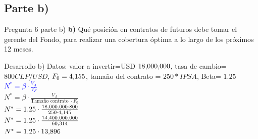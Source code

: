 \documentclass{beamer}
\newif\ifpresentacion
\newcommand{\pausa}{\ifpresentacion\pause\fi}
\begin{document}
  \subsection{Parte b)}
  \begin{frame}{Pregunta 6 parte b)}
    \textbf{b)} Qué posición en contratos de futuros debe tomar el gerente del Fondo, para realizar una cobertura óptima a lo largo de los próximos 12 meses.
  \end{frame}
  \begin{frame}{Desarrollo b)}
    Datos: valor a invertir=USD \(\miles{18000000}\),
    tasa de cambio= \(800 CLP/USD\),
    \(F_0=\miles{4155}\),
    tamaño del contrato = \(250 * IPSA\), Beta= \(1.25\)
    \\
    \textcolor{blue}{\(N^*=\beta \cdot \frac{V_A}{V_F}\)}\\
    \pausa
    \(N^*=\beta \cdot \frac{V_A}{\text{Tamaño contrato }\cdot F_0}\)\\
    \pausa
    \(N^*=1.25 \cdot \frac{\miles{18000000 }\cdot 800}{250\cdot \miles{4145}}\)\\
    \pausa
    \(N^*=1.25 \cdot \frac{\miles{14400000000}}{\miles{60314}}\)\\
    \pausa
    \(N^*=1.25 \cdot \miles{13896}\)\\
    \pausa
  \end{frame}

\end{document}
